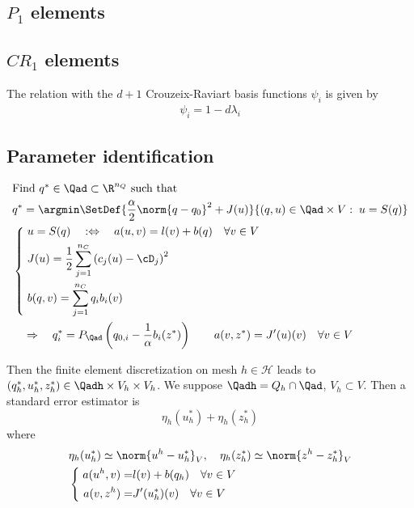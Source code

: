 %
\subsection{$P_1$ elements}\label{subsec:}
%
%
\subsection{$CR_1$ elements}\label{subsec:}
%
%
The relation with the $d+1$ Crouzeix-Raviart basis functions $\psi_i$ is given by 
%
\begin{align*}
\psi_i = 1 - d\lambda_i
\end{align*}
%


 
%
\subsection{Parameter identification}\label{subsec:}
%
%
%
\begin{align*}
&\mbox{Find $q^*\in \Qad\subset \R^{n_Q}$ such that}\\
&q^* = \argmin\SetDef{\frac{\alpha}{2}\norm{q-q_0}^2 +J(u)}{  (q,u)\in \Qad\times V:\; u = S(q)}\\
%
&\left\{\;
\begin{aligned}
&u = S(q) \quad:\Leftrightarrow\quad a(u,v) = l(v) + b(q)\quad\forall v\in V\\
&J(u) = \frac12 \sum_{j=1}^{n_C} \left( c_j(u) - \cD_j \right)^2\\
&b(q,v) = \sum_{j=1}^{n_C} q_i b_i(v)
\end{aligned}
\right.\\
&\quad\Rightarrow\quad
q^*_i = P_{\Qad}\left(q_{0,i} - \frac{1}{\alpha} b_i(z^*)\right)\qquad a(v,z^*) = J'(u)(v)\quad\forall v\in V
\end{align*}
%

Then the finite element discretization on mesh $h\in\mathcal H$ leads to $(q_h^*, u_h^*, z_h^*) \in \Qadh\times V_h\times V_h$.
We suppose $\Qadh = Q_h \cap \Qad$, $V_h\subset V$. Then a standard error estimator is
%
\begin{equation}\label{eq:}
\eta_h(u^*_h) + \eta_h(z^*_h)
\end{equation}
%
where 
%
\begin{align*}
&\eta_h(u^*_h) \simeq \norm{u^h-u^*_h}_V, \quad \eta_h(z^*_h) \simeq \norm{z^h-z^*_h}_V\\
&\left\{\;
\begin{aligned}
a(u^h,v) =& l(v) + b(q_h)\quad\forall v\in V\\
a(v,z^h) =& J'(u^*_h)(v)\quad\forall v\in V
\end{aligned}
\right.
\end{align*}
%


